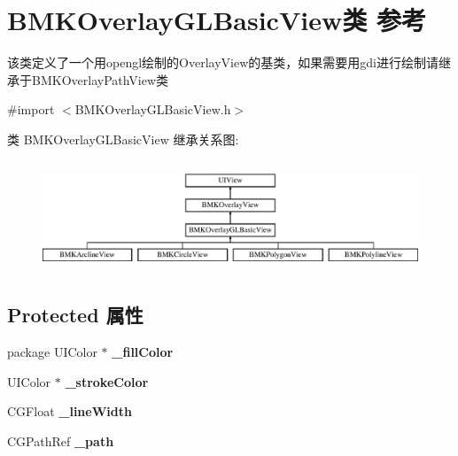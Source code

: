 \hypertarget{interface_b_m_k_overlay_g_l_basic_view}{\section{B\+M\+K\+Overlay\+G\+L\+Basic\+View类 参考}
\label{interface_b_m_k_overlay_g_l_basic_view}
}


该类定义了一个用opengl绘制的\+Overlay\+View的基类，如果需要用gdi进行绘制请继承于\+B\+M\+K\+Overlay\+Path\+View类  




{\ttfamily \#import $<$B\+M\+K\+Overlay\+G\+L\+Basic\+View.\+h$>$}

类 B\+M\+K\+Overlay\+G\+L\+Basic\+View 继承关系图\+:\begin{figure}[H]
\begin{center}
\leavevmode
\includegraphics[height=3.333333cm]{interface_b_m_k_overlay_g_l_basic_view}
\end{center}
\end{figure}
\subsection*{Protected 属性}
\begin{DoxyCompactItemize}
\item 
\hypertarget{interface_b_m_k_overlay_g_l_basic_view_a8adee647cc7ac0f196b7603405369ea7}{package U\+I\+Color $\ast$ {\bfseries \+\_\+fill\+Color}}\label{interface_b_m_k_overlay_g_l_basic_view_a8adee647cc7ac0f196b7603405369ea7}

\item 
\hypertarget{interface_b_m_k_overlay_g_l_basic_view_a1d4374c8eab668cec99c7440f04d9797}{U\+I\+Color $\ast$ {\bfseries \+\_\+stroke\+Color}}\label{interface_b_m_k_overlay_g_l_basic_view_a1d4374c8eab668cec99c7440f04d9797}

\item 
\hypertarget{interface_b_m_k_overlay_g_l_basic_view_a16d048b6d3c2d01cc2e66aa7e369b722}{C\+G\+Float {\bfseries \+\_\+line\+Width}}\label{interface_b_m_k_overlay_g_l_basic_view_a16d048b6d3c2d01cc2e66aa7e369b722}

\item 
\hypertarget{interface_b_m_k_overlay_g_l_basic_view_ad0bc8178da7b75c866b8425f49eeecc9}{C\+G\+Path\+Ref {\bfseries \+\_\+path}}\label{interface_b_m_k_overlay_g_l_basic_view_ad0bc8178da7b75c866b8425f49eeecc9}

\end{DoxyCompactItemize}
